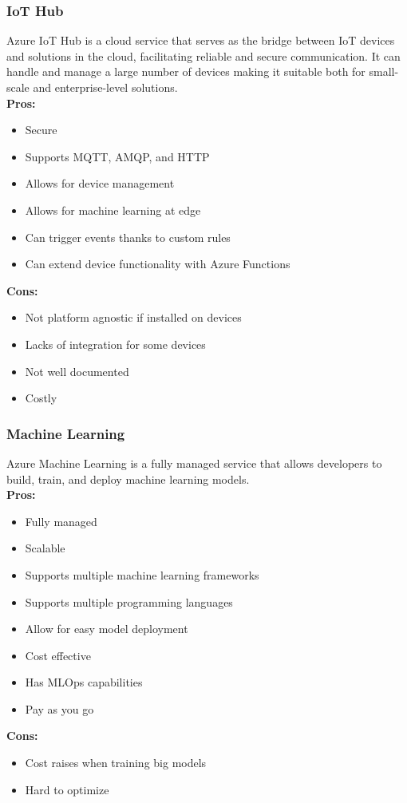         \subsubsection{IoT Hub}
        \label{azure:iot-hub}
        Azure IoT Hub is a cloud service that serves as the bridge between IoT devices and solutions in the cloud, facilitating reliable and secure communication.
        It can handle and manage a large number of devices making it suitable both for small-scale and enterprise-level solutions.\\
        \textbf{Pros:}
        \begin{itemize}
            \item Secure
            \item Supports MQTT, AMQP, and HTTP
            \item Allows for device management
            \item Allows for machine learning at edge
            \item Can trigger events thanks to custom rules
            \item Can extend device functionality with Azure Functions
        \end{itemize}
        \textbf{Cons:}
        \begin{itemize}
            \item Not platform agnostic if installed on devices
            \item Lacks of integration for some devices
            \item Not well documented
            \item Costly
        \end{itemize}

        \subsubsection{Machine Learning}
        \label{azure:machine-learning}
        Azure Machine Learning is a fully managed service that allows developers to build, train, and deploy machine learning models.\\
        \textbf{Pros:}
        \begin{itemize}
            \item Fully managed
            \item Scalable
            \item Supports multiple machine learning frameworks
            \item Supports multiple programming languages
            \item Allow for easy model deployment
            \item Cost effective
            \item Has MLOps capabilities
            \item Pay as you go
        \end{itemize}
        \textbf{Cons:}
        \begin{itemize}
            \item Cost raises when training big models
            \item Hard to optimize 
        \end{itemize}

